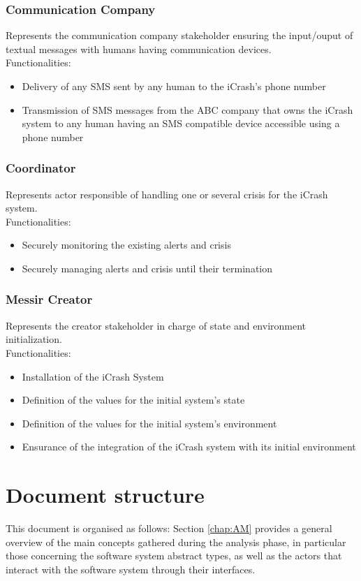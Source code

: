\subsubsection{Communication Company}
Represents the communication company stakeholder ensuring the input/ouput of
textual messages with humans having communication devices.\\
Functionalities:
\begin{itemize}
  \item Delivery of any SMS sent by any human to the iCrash's phone number
  \item Transmission of SMS messages from the ABC company that owns the iCrash
  system to any human having an SMS compatible device accessible using a phone
  number
\end{itemize}

\subsubsection{Coordinator}
Represents actor responsible of handling one or several crisis for the iCrash
system.\\
Functionalities:
\begin{itemize}
  \item Securely monitoring the existing alerts and crisis
  \item Securely managing alerts and crisis until their termination
\end{itemize}

\subsubsection{Messir Creator}
Represents the creator stakeholder in charge of state and environment
initialization.\\
Functionalities:
\begin{itemize}
  \item Installation of the iCrash System
  \item Definition of the values for the initial system’s state
  \item Definition of the values for the initial system’s environment
  \item Ensurance of  the integration of the iCrash system with its initial
  environment
\end{itemize}

  
\section{Document structure} 
This document is organised as follows: Section \ref{chap:AM} provides a general
overview of the main concepts gathered during the analysis phase, in particular those concerning the software system abstract
types, as well as the actors that interact with the
software system through their interfaces. 

